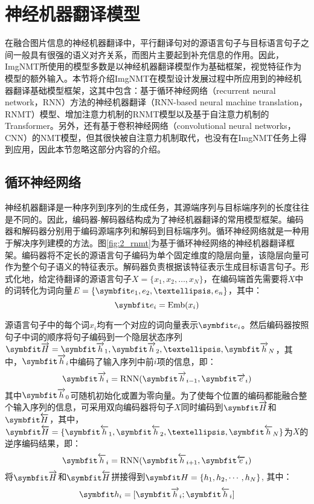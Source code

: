 \section{神经机器翻译模型}
\label{sec:2_nmt}
在融合图片信息的神经机器翻译中，平行翻译句对的源语言句子与目标语言句子之间一般具有很强的语义对齐关系，而图片主要起到补充信息的作用。因此，ImgNMT所使用的模型多数是以神经机器翻译模型作为基础框架，视觉特征作为模型的额外输入。本节将介绍ImgNMT在模型设计发展过程中所应用到的神经机器翻译基础模型框架，这其中包含：基于循环神经网络（recurrent neural network，RNN）方法的神经机器翻译（RNN-based neural machine translation，RNMT）模型、增加注意力机制的RNMT模型以及基于自注意力机制的Transformer。另外，还有基于卷积神经网络（convolutional neural networks，CNN）的NMT模型，但其很快被自注意力机制取代，也没有在ImgNMT任务上得到应用，因此本节忽略这部分内容的介绍。

\subsection{循环神经网络}
\label{sec:2_rnn}

神经机器翻译是一种序列到序列的生成任务，其源端序列与目标端序列的长度往往是不同的。因此，编码器-解码器结构成为了神经机器翻译的常用模型框架。编码器和解码器分别用于编码源端序列和解码到目标端序列。循环神经网络就是一种用于解决序列建模的方法。图\ref{fig:2_rnmt}为基于循环神经网络的神经机器翻译框架。编码器将不定长的源语言句子编码为单个固定维度的隐层向量，该隐层向量可作为整个句子语义的特征表示。解码器负责根据该特征表示生成目标语言句子。形式化地，给定待翻译的源语言句子$X=\{x_1,x_2,…,x_N\}$，在编码端首先需要将$X$中的词转化为词向量$E=\{\Vector{e_1,e_2,…,e_n}\}$，其中：
\begin{equation}
    \Vector{e_i}=\mathrm{Emb}(x_i)
\end{equation}

源语言句子中的每个词$x_i$均有一个对应的词向量表示$\Vector{e_i}$。然后编码器按照句子中词的顺序将句子编码到一个隐层状态序列$\rarwvec{H}={\rarwvec{h}_1,\rarwvec{h}_2,…,\rarwvec{h}_N}$，其中，$\rarwvec{h}_i$中编码了输入序列中前$i$项的信息，即：
\begin{equation}
    \rarwvec{h}_i=\mathrm{RNN}(\rarwvec{h}_{i-1},\rarwvec{e}_i)
\end{equation}
其中$\rarwvec{h}_{0}$可随机初始化或置为零向量。为了使每个位置的编码都能融合整个输入序列的信息，可采用双向编码器将句子$X$同时编码到$\rarwvec{H}$和$\larwvec{H}$，其中，$\larwvec{H}=\{\larwvec{h}_1,\larwvec{h}_2,…,\larwvec{h}_N\}$为$X$的逆序编码结果，即：
\begin{equation}
    \larwvec{h}_i=\mathrm{RNN}(\larwvec{h}_{i+1},\larwvec{e}_i)
\end{equation}
将$\rarwvec{H}$和$\larwvec{H}$拼接得到$\Vector{H=\{h_1,h_2,\cdots,h_N}\}$, 其中：
\begin{equation}
    \Vector{h_i}=[\rarwvec{h}_i;\larwvec{h}_i]
\end{equation}

